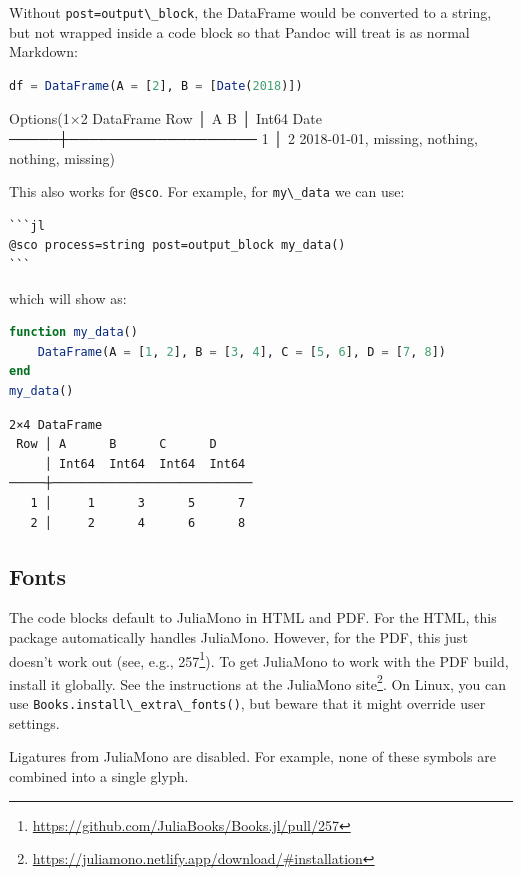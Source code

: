 \documentclass[
  notoc %
]{tufte-book}
\DeclareRobustCommand{\href}[2]{#2\footnote{\url{#1}}}
\newcommand{\passthrough}[1]{#1}
\begin{document}
Without \passthrough{\lstinline!post=output\_block!}, the DataFrame
would be converted to a string, but not wrapped inside a code block so
that Pandoc will treat is as normal Markdown:

\begin{lstlisting}[language=Julia]
df = DataFrame(A = [2], B = [Date(2018)])
\end{lstlisting}

Options(1×2 DataFrame Row │ A B │ Int64 Date ─────┼─────────────────── 1
│ 2 2018-01-01, missing, nothing, nothing, missing)

This also works for \passthrough{\lstinline!@sco!}. For example, for
\passthrough{\lstinline!my\_data!} we can use:

\begin{lstlisting}
```jl
@sco process=string post=output_block my_data()
```
\end{lstlisting}

which will show as:

\begin{lstlisting}[language=Julia]
function my_data()
    DataFrame(A = [1, 2], B = [3, 4], C = [5, 6], D = [7, 8])
end
my_data()
\end{lstlisting}

\begin{lstlisting}[language=Output]
2×4 DataFrame
 Row │ A      B      C      D
     │ Int64  Int64  Int64  Int64
─────┼────────────────────────────
   1 │     1      3      5      7
   2 │     2      4      6      8
\end{lstlisting}

\hypertarget{fonts}{%
\subsection{Fonts}\label{fonts}}

The code blocks default to JuliaMono in HTML and PDF. For the HTML, this
package automatically handles JuliaMono. However, for the PDF, this just
doesn't work out (see, e.g.,
\href{https://github.com/JuliaBooks/Books.jl/pull/257}{257}). To get
JuliaMono to work with the PDF build, install it globally. See the
instructions at the
\href{https://juliamono.netlify.app/download/\#installation}{JuliaMono
site}. On Linux, you can use
\passthrough{\lstinline!Books.install\_extra\_fonts()!}, but beware that
it might override user settings.

Ligatures from JuliaMono are disabled. For example, none of these
symbols are combined into a single glyph.
\end{document}
